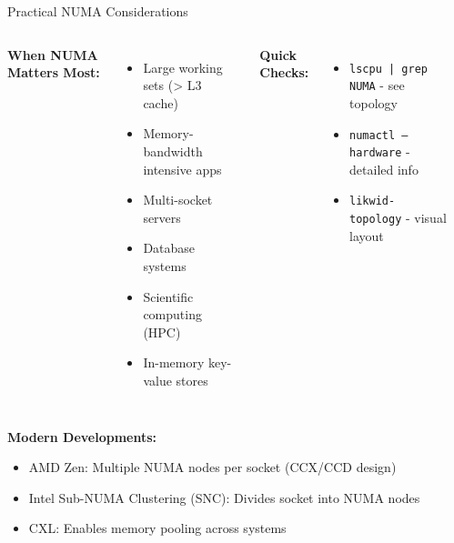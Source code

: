 \documentclass[aspectratio=169,12pt]{beamer}
\begin{document}
\begin{frame}{Practical NUMA Considerations}
\begin{columns}[T]
\textbf{When NUMA Matters Most:}
\begin{itemize}
\item Large working sets (> L3 cache)
\item Memory-bandwidth intensive apps
\item Multi-socket servers
\item Database systems
\item Scientific computing (HPC)
\item In-memory key-value stores
\end{itemize}

\vspace{0.3cm}
\textbf{Quick Checks:}
\begin{itemize}
\item \texttt{lscpu | grep NUMA} - see topology
\item \texttt{numactl --hardware} - detailed info
\item \texttt{likwid-topology} - visual layout
\end{itemize}

\begin{center}
\end{center}
\end{columns}

\vspace{0.3cm}
\textbf{Modern Developments:}
\begin{itemize}
\item AMD Zen: Multiple NUMA nodes per socket (CCX/CCD design)
\item Intel Sub-NUMA Clustering (SNC): Divides socket into NUMA nodes
\item CXL: Enables memory pooling across systems
\end{itemize}
\end{frame}
\end{document}
